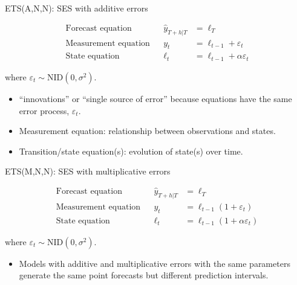\documentclass[
  14pt,
  ignorenonframetext,
  aspectratio=169,
]{beamer}
\providecommand{\tightlist}{%
  \setlength{\itemsep}{0pt}\setlength{\parskip}{0pt}}
\begin{document}
\begin{frame}{ETS(A,N,N): SES with additive errors}
\protect{}\label{etsann-ses-with-additive-errors}
\begin{block}{}\vspace*{-0.7cm}
\begin{align*}
\text{Forecast equation}&& \hat{y}_{T+h|T} &= \ell_T \\
\text{Measurement equation}&& y_t &= \ell_{t-1} + \varepsilon_t\\
\text{State equation}&& \ell_t&=\ell_{t-1}+\alpha \varepsilon_t
\end{align*}
\end{block}\vspace*{-0.4cm}

where \(\varepsilon_t\sim\text{NID}(0,\sigma^2)\).\pause

\begin{itemize}
\tightlist
\item
  ``innovations'' or ``single source of error'' because equations have
  the same error process, \(\varepsilon_t\).
\item
  Measurement equation: relationship between observations and states.
\item
  Transition/state equation(s): evolution of state(s) over time.
\end{itemize}

\vspace*{10cm}
\end{frame}

\begin{frame}{ETS(M,N,N): SES with multiplicative errors}
\protect{}\label{etsmnn-ses-with-multiplicative-errors}
\begin{block}{}\vspace*{-0.7cm}
\begin{align*}
\text{Forecast equation}&& \hat{y}_{T+h|T} &= \ell_T \\
\text{Measurement equation}&& y_t &= \ell_{t-1}(1 + \varepsilon_t)\\
\text{State equation}&& \ell_t&=\ell_{t-1} (1+\alpha\varepsilon_t)
\end{align*}
\end{block}\vspace*{-0.4cm}

where \(\varepsilon_t\sim\text{NID}(0,\sigma^2)\).\pause

\begin{itemize}
\tightlist
\item
  Models with additive and multiplicative errors with the same
  parameters generate the same point forecasts but different prediction
  intervals.
\end{itemize}

\vspace*{10cm}
\end{frame}
\end{document}
